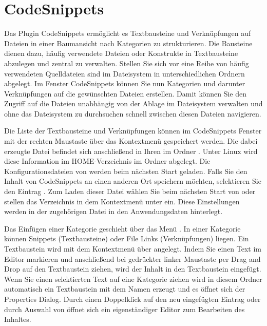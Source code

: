 \section{CodeSnippets}

Das Plugin CodeSnippets ermöglicht es Textbausteine und Verknüpfungen auf Dateien in einer Baumansicht nach Kategorien zu strukturieren. Die Bausteine dienen dazu, häufig verwendete Dateien oder Konstrukte in Textbausteine abzulegen und zentral zu verwalten. Stellen Sie sich vor eine Reihe von häufig verwendeten Quelldateien sind im Dateisystem in unterschiedlichen Ordnern abgelegt. Im Fenster CodeSnippets können Sie nun Kategorien und darunter Verknüpfungen auf die gewünschten Dateien erstellen. Damit können Sie den Zugriff auf die Dateien unabhängig von der Ablage im Dateisystem verwalten und ohne das Dateisystem zu durchsuchen schnell zwischen diesen Dateien navigieren.

Die Liste der Textbausteine und Verknüpfungen können im CodeSnippets Fenster mit der rechten Maustaste über das Kontextmenü  gespeichert werden. Die dabei erzeugte Datei  befindet sich anschließend in Ihren  im Ordner . Unter Linux wird diese Information im HOME-Verzeichnis im Ordner   abgelegt. Die Konfigurationsdateien von \codeblocks werden beim nächsten Start geladen. Falls Sie den Inhalt von CodeSnippets an einen anderen Ort speichern möchten, selektieren Sie den Eintrag . Zum Laden dieser Datei wählen Sie beim nächsten Start von \codeblocks {} oder stellen das Verzeichnis in dem Kontextmenü  unter  ein. Diese Einstellungen werden in der zugehörigen Datei  in den Anwendungsdaten hinterlegt.

Das Einfügen einer Kategorie geschieht über das Menü . In einer Kategorie können Snippets (Textbausteine) oder File Links (Verknüpfungen) liegen. Ein Textbaustein wird mit dem Kontextmenü über  angelegt. Indem Sie einen Text im \codeblocks Editor markieren und anschließend bei gedrückter linker Maustaste per Drag and Drop auf den Textbaustein ziehen, wird der Inhalt in den Textbaustein eingefügt. Wenn Sie einen selektierten Text auf eine Kategorie ziehen wird in diesem Ordner automatisch ein Textbaustein mit dem Namen  erzeugt und es öffnet sich der Properties Dialog. Durch einen Doppelklick auf den neu eingefügten Eintrag oder durch Auswahl von  öffnet sich ein eigenständiger Editor zum Bearbeiten des Inhaltes.

